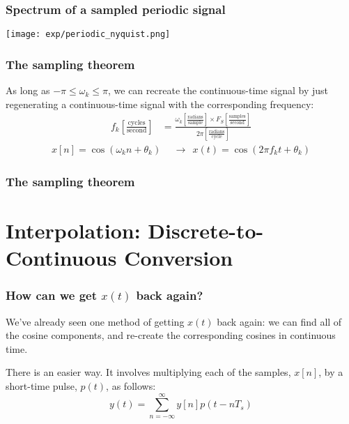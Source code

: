 \documentclass{beamer}
\begin{document}
\begin{frame}
  \frametitle{Spectrum of a sampled periodic signal}


  \centerline{\texttt{[image: exp/periodic\_nyquist.png]}}
\end{frame}

\begin{frame}
  \frametitle{The sampling theorem}

  As long as $-\pi\le\omega_k\le \pi$, we can recreate the
  continuous-time signal by just regenerating a continuous-time signal
  with the corresponding frequency:
  \begin{align*}
    f_k \left[\frac{\textrm{cycles}}{\textrm{second}}\right] &=
    \frac{\omega_k \left[\frac{\textrm{radians}}{\textrm{sample}}\right]\times F_S \left[\frac{\textrm{samples}}{\textrm{second}}\right]}{2\pi\left[\frac{\textrm{radians}}{\textrm{cycle}}\right]}
  \end{align*}
  \begin{align*}
    x[n] = \cos(\omega_k n+\theta_k)~~&\rightarrow~~
    x(t) = \cos(2\pi f_k t+\theta_k)
  \end{align*}
\end{frame}

\begin{frame}
  \frametitle{The sampling theorem}

\end{frame}

\section[Interpolation]{Interpolation: Discrete-to-Continuous Conversion}
\setcounter{subsection}{1}

\begin{frame}
  \frametitle{How can we get $x(t)$ back again?}

  We've already seen one method of getting $x(t)$ back again: we can
  find all of the cosine components, and re-create the corresponding
  cosines in continuous time.

  There is an easier way.  It involves multiplying each of the
  samples, $x[n]$, by a short-time pulse, $p(t)$, as follows:
  \begin{displaymath}
    y(t) = \sum_{n=-\infty}^\infty y[n]p(t-nT_s)
  \end{displaymath}
\end{frame}
\end{document}
